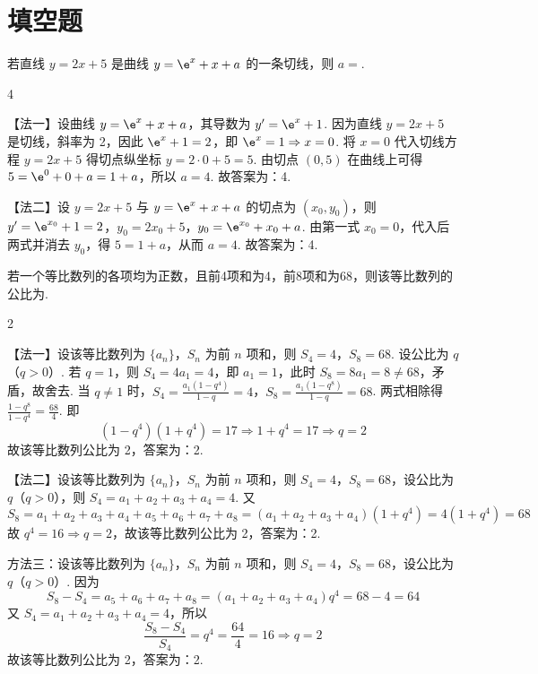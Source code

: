 \section{填空题}

\begin{problem}
若直线 \(y = 2x + 5\) 是曲线 \(y = \e^x + x + a\) 的一条切线，则 \(a =\)\fillinblank{}.
\end{problem}

\begin{answer}
4
\end{answer}

\begin{solution}
【法一】设曲线 \(y = \e^x + x + a\)，其导数为
\(y'=\e^x+1\). 因为直线 \(y = 2x + 5\) 是切线，斜率为 2，因此 \(\e^x+1=2\)，即 \(\e^x=1 \Rightarrow x=0\). 将 \(x=0\) 代入切线方程 \(y=2x+5\) 得切点纵坐标 \(y=2\cdot 0+5=5\). 由切点 \((0,5)\) 在曲线上可得 \(5=\e^0+0+a=1+a\)，所以 \(a=4\). 故答案为：4.

【法二】设 \(y=2x+5\) 与 \(y=\e^x+x+a\) 的切点为 \((x_0,y_0)\)，则
\(y' = \e^{x_0}+1=2\)，\(y_0 = 2x_0+5\)，\(y_0 = \e^{x_0}+x_0+a\).
由第一式 \(x_0=0\)，代入后两式并消去 \(y_0\)，得 \(5=1+a\)，从而
\(a=4\).
故答案为：4.
\end{solution}

\begin{problem}
若一个等比数列的各项均为正数，且前4项和为4，前8项和为68，则该等比数列的公比为\fillinblank{}.
\end{problem}

\begin{answer}
2
\end{answer}

\begin{solution}
【法一】设该等比数列为 \(\{a_n\}\)，\(S_n\) 为前 \(n\) 项和，则 \(S_4=4\)，\(S_8=68\). 设公比为 \(q\)（\(q>0\)）.
若 \(q=1\)，则 \(S_4=4a_1=4\)，即 \(a_1=1\)，此时 \(S_8=8a_1=8\neq68\)，矛盾，故舍去. 当 \(q\neq1\) 时，\(S_4 = \frac{a_1(1-q^4)}{1-q}=4\)，\(S_8 = \frac{a_1(1-q^8)}{1-q}=68\). 两式相除得 \(\frac{1-q^8}{1-q^4}=\frac{68}{4}\). 即
\[
(1-q^4)(1+q^4)=17 \Rightarrow 1+q^4=17 \Rightarrow q=2
\]
故该等比数列公比为 2，答案为：2.

【法二】设该等比数列为 \(\{a_n\}\)，\(S_n\) 为前 \(n\) 项和，则 \(S_4=4\)，\(S_8=68\)，设公比为 \(q\)（\(q>0\)），则 \(S_4=a_1+a_2+a_3+a_4=4\). 又
\[
S_8=a_1+a_2+a_3+a_4+a_5+a_6+a_7+a_8=(a_1+a_2+a_3+a_4)(1+q^4)=4(1+q^4)=68
\]
故 \(q^4=16 \Rightarrow q=2\)，故该等比数列公比为 2，答案为：2.

方法三：设该等比数列为 \(\{a_n\}\)，\(S_n\) 为前 \(n\) 项和，则 \(S_4=4\)，\(S_8=68\)，设公比为 \(q\)（\(q>0\)）. 因为
\[
S_8-S_4=a_5+a_6+a_7+a_8=(a_1+a_2+a_3+a_4)q^4=68-4=64
\]
又 \(S_4=a_1+a_2+a_3+a_4=4\)，所以
\[
\frac{S_8-S_4}{S_4}=q^4=\frac{64}{4}=16 \Rightarrow q=2
\]
故该等比数列公比为 2，答案为：2.
\end{solution}

